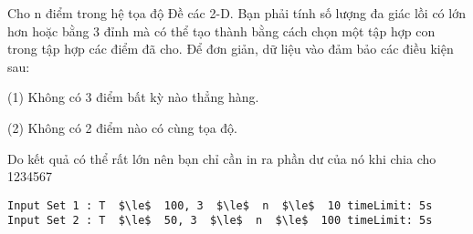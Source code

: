Cho n điểm trong hệ tọa độ Đề các 2-D. Bạn phải tính số lượng đa giác lồi có lớn hơn hoặc bằng 3 đỉnh mà có thể tạo thành bằng cách chọn một tập hợp con trong tập hợp các điểm đã cho. Để đơn giản, dữ liệu vào đảm bảo các điều kiện sau:  
\begin{itemize}

    (1) Không có 3 điểm bất kỳ nào thẳng hàng.   

    (2) Không có 2 điểm nào có cùng tọa độ.   
\end{itemize}

   Do kết quả có thể rất lớn nên bạn chỉ cần in ra phần dư của nó khi chia cho 1234567
\begin{verbatim}
Input Set 1 : T  $\le$  100, 3  $\le$  n  $\le$  10 timeLimit: 5s  
Input Set 2 : T  $\le$  50, 3  $\le$  n  $\le$  100 timeLimit: 5s 
\end{verbatim}